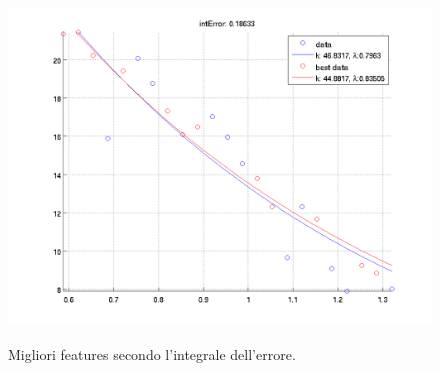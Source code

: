 \documentclass[12pt]{report}
\begin{document}
\begin{figure}[H]
\begin{minipage}[t]{0.5\linewidth}
	\includegraphics[scale=\imFeatBW]{images/best6}\\
\end{minipage}
\caption[short]{Migliori features secondo l'integrale dell'errore.}
\label{fig:bestIntErr}
\end{figure}
\end{document}

